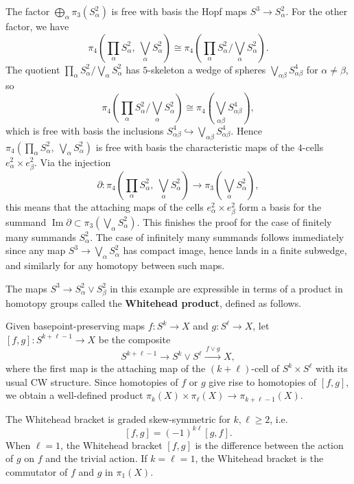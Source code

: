 \documentclass[12pt]{article}
\begin{document}
\begin{example}
The factor
$\bigoplus_\alpha \pi_3(S^2_\alpha)$
is free with basis the Hopf maps $S^3\to S^2_\alpha$. For the other factor, we have
\[
\pi_4\!\left(\prod_\alpha S^2_\alpha,\ \bigvee_\alpha S^2_\alpha\right)
\cong
\pi_4\!\left(\prod_\alpha S^2_\alpha \Big/ \bigvee_\alpha S^2_\alpha\right).
\]
The quotient
$\prod_\alpha S^2_\alpha \Big/ \bigvee_\alpha S^2_\alpha$
has $5$-skeleton a wedge of spheres
$\bigvee_{\alpha\beta} S^4_{\alpha\beta}$
for $\alpha\neq\beta$, so
\[
\pi_4\!\left(\prod_\alpha S^2_\alpha \Big/ \bigvee_\alpha S^2_\alpha\right)
\cong
\pi_4\!\left(\bigvee_{\alpha\beta} S^4_{\alpha\beta}\right),
\]
which is free with basis the inclusions
$S^4_{\alpha\beta}\hookrightarrow \bigvee_{\alpha\beta} S^4_{\alpha\beta}$.
Hence
$\pi_4\!\left(\prod_\alpha S^2_\alpha,\ \bigvee_\alpha S^2_\alpha\right)$
is free with basis the characteristic maps of the $4$-cells
$e^2_\alpha\times e^2_\beta$.
Via the injection
\[
\partial:\pi_4\!\left(\prod_\alpha S^2_\alpha,\ \bigvee_\alpha S^2_\alpha\right)
\to
\pi_3\!\left(\bigvee_\alpha S^2_\alpha\right),
\]
this means that the attaching maps of the cells
$e^2_\alpha\times e^2_\beta$
form a basis for the summand
$\operatorname{Im}\partial \subset \pi_3\!\left(\bigvee_\alpha S^2_\alpha\right)$.
This finishes the proof for the case of finitely many summands $S^2_\alpha$. The case of infinitely many summands follows immediately since any map
$S^3\to \bigvee_\alpha S^2_\alpha$
has compact image, hence lands in a finite subwedge, and similarly for any homotopy between such maps.
\end{example}
The maps
$S^3\to S^2_\alpha \vee S^2_\beta$
in this example are expressible in terms of a product in homotopy groups called the \textbf{Whitehead product}, defined as follows.
\begin{definition}
 Given basepoint-preserving maps
$f:S^k\to X$
and
$g:S^\ell\to X$,
let
$[f,g]:S^{k+\ell-1}\to X$
be the composite
\[
S^{k+\ell-1}\longrightarrow S^k\vee S^\ell
\xrightarrow{\,f\vee g\,} X,
\]
where the first map is the attaching map of the $(k+\ell)$-cell of
$S^k\times S^\ell$
with its usual CW structure. Since homotopies of $f$ or $g$ give rise to homotopies of $[f,g]$, we obtain a well-defined product
$\pi_k(X)\times \pi_\ell(X)\to \pi_{k+\ell-1}(X)$.
\end{definition}

The Whitehead bracket is graded skew-symmetric for $k,\ell\ge 2$, i.e.
\[[f,g]=(-1)^{k\ell}[g,f].
\]
When $\ell = 1$, the Whitehead bracket $[f,g]$ is the difference between the action of $g$ on $f$ and the trivial action. If $k = \ell = 1$, the Whitehead bracket is the commutator of $f$ and $g$ in $\pi_1(X)$.
\end{document}
